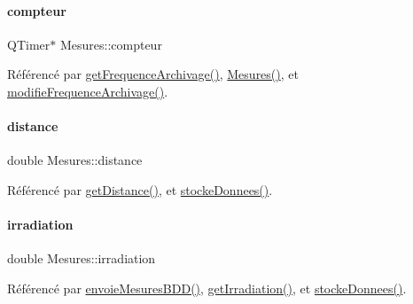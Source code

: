 \paragraph{\texorpdfstring{compteur}{compteur}}
{\footnotesize\ttfamily Q\+Timer$\ast$ Mesures\+::compteur\hspace{0.3cm}{\ttfamily [private]}}



Référencé par \hyperlink{class_mesures_ae969e38402b8d19fe9b484f368200578}{get\+Frequence\+Archivage()}, \hyperlink{class_mesures_aa24ed1e055242fab5adab3f8f057c9b1}{Mesures()}, et \hyperlink{class_mesures_ac1d2ea97f648264ebd690fba8f7020cc}{modifie\+Frequence\+Archivage()}.

\mbox{\label{class_mesures_a276f71168b1dcecf2051631d19aa8eeb}} 
\paragraph{\texorpdfstring{distance}{distance}}
{\footnotesize\ttfamily double Mesures\+::distance\hspace{0.3cm}{\ttfamily [private]}}



Référencé par \hyperlink{class_mesures_aa40d78428855bab861cc9a57582c8d42}{get\+Distance()}, et \hyperlink{class_mesures_a77652c2332a9234bf08b463d1d389aa5}{stocke\+Donnees()}.

\mbox{\label{class_mesures_a77cde7672dac5e544b7288364ec7c7b5}} 
\paragraph{\texorpdfstring{irradiation}{irradiation}}
{\footnotesize\ttfamily double Mesures\+::irradiation\hspace{0.3cm}{\ttfamily [private]}}



Référencé par \hyperlink{class_mesures_a9eb8d49c9f60b3801110a5c3d0c50149}{envoie\+Mesures\+B\+D\+D()}, \hyperlink{class_mesures_af260c8f685e3519681b3ca0086d70b31}{get\+Irradiation()}, et \hyperlink{class_mesures_a77652c2332a9234bf08b463d1d389aa5}{stocke\+Donnees()}.

\mbox{\label{class_mesures_a2688d0da4acf9d91ea0befd6ed0bd140}} 
